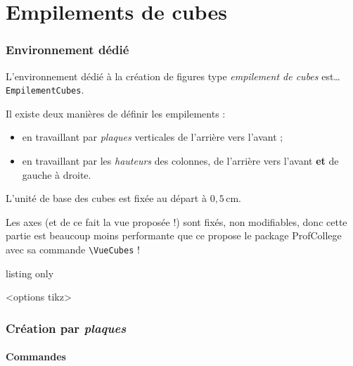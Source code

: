 \documentclass[french,a4paper,11pt]{article}
\begin{document}
\newpage

\part{Empilements de cubes}

\section{Environnement dédié}

\begin{cautionblock}
L'environnement dédié à la création de figures type \textit{empilement de cubes} est\ldots{} \texttt{EmpilementCubes}.

Il existe deux manières de définir les empilements :

\begin{itemize}
	\item en travaillant par \textit{plaques} verticales de l'arrière vers l'avant ;
	\item en travaillant par les \textit{hauteurs} des colonnes, de l'arrière vers l'avant \textbf{et} de gauche à droite.
\end{itemize}

L'unité de base des cubes est fixée au départ à $0{,}5$\,cm.
\end{cautionblock}

\begin{importantblock}
Les axes (et de ce fait la vue proposée !) sont fixés, non modifiables, donc cette partie est beaucoup moins performante que ce propose le package \textsf{ProfCollege} avec sa commande \texttt{\textbackslash VueCubes} !
\end{importantblock}

\begin{PresCodeTex}{listing only}
\begin{EmpilementCubes}[échelle]<options tikz>
\end{EmpilementCubes}
\end{PresCodeTex}

\section{Création par \textit{plaques}}

\subsection{Commandes}
\end{document}
